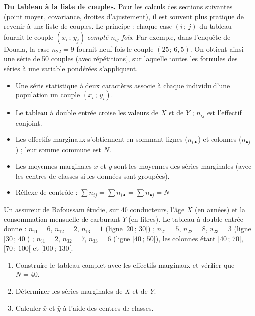 \documentclass[11pt]{article}
\newcommand{\cle}[1]{{\popxbold\color{popdark}#1}}
\begin{document}
\textbf{Du tableau à la liste de couples.} Pour les calculs des sections suivantes (point moyen, covariance, droites d'ajustement), il est souvent plus pratique de revenir à une liste de couples. Le principe : chaque case $(i\,;\,j)$ du tableau fournit le couple $(x_i\,;\,y_j)$ \emph{compté $n_{ij}$ fois}. Par exemple, dans l'enquête de Douala, la case $n_{22} = 9$ fournit neuf fois le couple $(25\,;\,6{,}5)$. On obtient ainsi une série de 50 couples (avec répétitions), sur laquelle toutes les formules des séries à une variable pondérées s'appliquent.

\begin{aretenir}
\begin{itemize}
\item Une \cle{série statistique à deux caractères} associe à chaque individu d'une population un couple $(x_i\,;\,y_i)$.
\item Le \cle{tableau à double entrée} croise les valeurs de $X$ et de $Y$ ; $n_{ij}$ est l'effectif conjoint.
\item Les \cle{effectifs marginaux} s'obtiennent en sommant lignes ($n_{i\bullet}$) et colonnes ($n_{\bullet j}$) ; leur somme commune est $N$.
\item Les \cle{moyennes marginales} $\bar{x}$ et $\bar{y}$ sont les moyennes des séries marginales (avec les centres de classes si les données sont groupées).
\item Réflexe de contrôle : $\sum n_{ij} = \sum n_{i\bullet} = \sum n_{\bullet j} = N$.
\end{itemize}
\end{aretenir}

\begin{exercice}
Un assureur de Bafoussam étudie, sur 40 conducteurs, l'âge $X$ (en années) et la consommation mensuelle de carburant $Y$ (en litres). Le tableau à double entrée donne : $n_{11} = 6$, $n_{12} = 2$, $n_{13} = 1$ (ligne $[20\,;\,30[$) ; $n_{21} = 5$, $n_{22} = 8$, $n_{23} = 3$ (ligne $[30\,;\,40[$) ; $n_{31} = 2$, $n_{32} = 7$, $n_{33} = 6$ (ligne $[40\,;\,50[$), les colonnes étant $[40\,;\,70[$, $[70\,;\,100[$ et $[100\,;\,130[$.
\begin{enumerate}
\item Construire le tableau complet avec les effectifs marginaux et vérifier que $N = 40$.
\item Déterminer les séries marginales de $X$ et de $Y$.
\item Calculer $\bar{x}$ et $\bar{y}$ à l'aide des centres de classes.
\end{enumerate}
\end{exercice}
\end{document}
